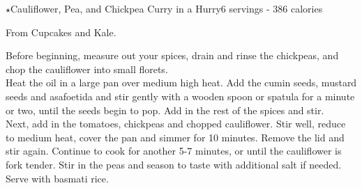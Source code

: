 \begin{recipe}{\texorpdfstring{$\star$}{str}Cauliflower, Pea, and Chickpea Curry in a Hurry}{6 servings - 386 calories}{}

\freeform From Cupcakes and Kale.


Before beginning, measure out your spices, drain and rinse the chickpeas, and chop the cauliflower into small florets.\\

Heat the oil in a large pan over medium high heat. Add the cumin seeds, mustard seeds and asafoetida and stir gently with a wooden spoon or spatula for a minute or two, until the seeds begin to pop. Add in the rest of the spices and stir.\\

Next, add in the tomatoes, chickpeas and chopped cauliflower. Stir well, reduce to medium heat, cover the pan and simmer for 10 minutes. Remove the lid and stir again. Continue to cook for another 5-7 minutes, or until the cauliflower is fork tender. Stir in the peas and season to taste with additional salt if needed. Serve with basmati rice.

\end{recipe}